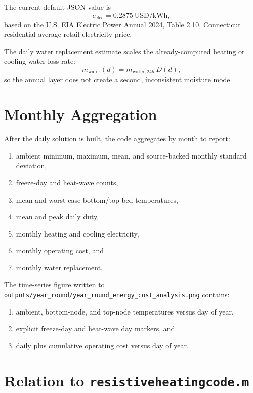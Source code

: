 \documentclass{article}
\begin{document}
The current default JSON value is
\begin{equation}
c_{\mathrm{elec}} = 0.2875 \ \mathrm{USD/kWh},
\end{equation}
based on the U.S. EIA Electric Power Annual 2024, Table 2.10, Connecticut
residential average retail electricity price.

The daily water replacement estimate scales the already-computed heating or
cooling water-loss rate:
\begin{equation}
m_{\mathrm{water}}(d)
=
\dot{m}_{\mathrm{water},24h}\,D(d),
\end{equation}
so the annual layer does not create a second, inconsistent moisture model.

\section{Monthly Aggregation}

After the daily solution is built, the code aggregates by month to report:
\begin{enumerate}
\item ambient minimum, maximum, mean, and source-backed monthly standard
deviation,
\item freeze-day and heat-wave counts,
\item mean and worst-case bottom/top bed temperatures,
\item mean and peak daily duty,
\item monthly heating and cooling electricity,
\item monthly operating cost, and
\item monthly water replacement.
\end{enumerate}

The time-series figure written to
\texttt{outputs/year\_round/year\_round\_energy\_cost\_analysis.png}
contains:
\begin{enumerate}
\item ambient, bottom-node, and top-node temperatures versus day of year,
\item explicit freeze-day and heat-wave day markers, and
\item daily plus cumulative operating cost versus day of year.
\end{enumerate}

\section{Relation to \texttt{resistiveheatingcode.m}}
\end{document}
